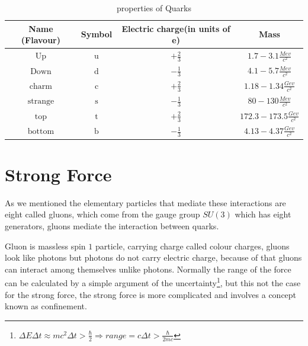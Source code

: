 \begin{table}
\begin{center} 
 \begin{tabular}{|c|c|c|c|} \hline 
  Name (Flavour) & Symbol & Electric charge(in units of e) & Mass  \\ \hline 
  $\text{Up}$ & $\text{u}$ &$ +\frac{2}{3}$ & $1.7-3.1 \frac{Mev}{c^2}$\\\hline
  $\text{Down}$&$\text{d}$&$-\frac{1}{3}$& $4.1-5.7\frac{Mev}{c^2}$\\\hline
  $\text{charm}$&$\text{c}$&$+\frac{2}{3}$&$1.18-1.34\frac{Gev}{c^2}$\\\hline
  $\text{strange}$&$\text{s}$&$-\frac{1}{3}$&$80-130\frac{Mev}{c^2}$\\\hline
  $\text{top}$&$\text{t}$&$+\frac{2}{3}$&$172.3-173.5\frac{Gev}{c^2}$\\\hline
  $\text{bottom}$&$\text{b}$&$-\frac{1}{3}$&$4.13-4.37\frac{Gev}{c^2}$\\\hline
 \end{tabular}
\caption{properties of Quarks}
\label{table1.1}
\end{center}
\end{table}



\section{Strong Force}
As we mentioned the elementary particles that mediate these interactions
are eight called gluons, which come from the gauge group $SU(3)$ which has eight generators, gluons mediate the interaction between quarks.

Gluon is massless spin $1$ particle, carrying charge called colour charges, gluons look like photons but photons do not carry electric charge, because of that gluons can interact among themselves unlike photons.
Normally the range of the force can be calculated by a simple argument of the uncertainty\footnote{$\Delta E \Delta t \approx m c^2 \Delta t > \frac{\hbar}{2} \Longrightarrow range = c \Delta t > \frac{\hbar}{2 m c}$}, but this not the case for the strong force, the strong force is more complicated
and involves a concept known as confinement.

